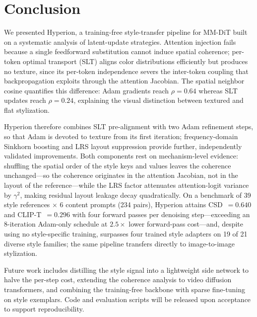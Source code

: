 \section{Conclusion}
\label{sec:conclusion}

We presented Hyperion, a training-free style-transfer pipeline for
MM-DiT built on a systematic analysis of latent-update strategies.
Attention injection fails because a single feedforward substitution cannot
induce spatial coherence; per-token optimal transport (SLT) aligns color
distributions efficiently but produces no texture, since its per-token
independence severs the inter-token coupling that backpropagation exploits
through the attention Jacobian.
The spatial neighbor cosine quantifies this difference: Adam gradients reach
$\rho = 0.64$ whereas SLT updates reach $\rho = 0.24$, explaining the visual
distinction between textured and flat stylization.

Hyperion therefore combines SLT pre-alignment with two Adam refinement
steps, so that Adam is devoted to texture from its first iteration;
frequency-domain Sinkhorn boosting and LRS layout suppression provide
further, independently validated improvements.
Both components rest on mechanism-level evidence: shuffling the spatial
order of the style keys and values leaves the coherence unchanged---so the
coherence originates in the attention Jacobian, not in the layout of the
reference---while the LRS factor attenuates attention-logit variance by
$\gamma^{2}$, making residual layout leakage decay quadratically.
On a benchmark of 39 style references $\times$ 6 content prompts (234 pairs),
Hyperion attains CSD~$=0.640$ and CLIP-T~$=0.296$ with four forward passes
per denoising step---exceeding an 8-iteration Adam-only schedule at
$2.5\times$ lower forward-pass cost---and, despite using no style-specific
training, surpasses four trained style adapters on 19 of 21 diverse style
families; the same pipeline transfers directly to image-to-image
stylization.

Future work includes distilling the style signal into a lightweight side
network to halve the per-step cost, extending the coherence analysis to video
diffusion transformers, and combining the training-free backbone with sparse
fine-tuning on style exemplars.
Code and evaluation scripts will be released upon acceptance to support reproducibility.
